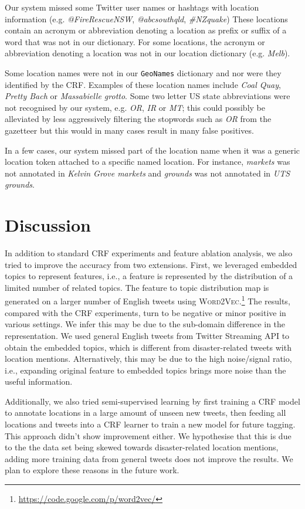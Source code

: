 \documentclass[11pt]{article}
\newcommand{\ie}{i.e.,\xspace}
\newcommand{\geoname}{\texttt{GeoNames}\xspace}
\newcommand{\myex}[1]{\textit{#1}}
\newcommand{\wordvec}{\textsc{Word2Vec}\xspace}
\newcommand{\myurl}[1]{{\footnotesize\url{#1}}}
\begin{document}
Our system missed some Twitter user names or hashtags with location information (e.g. \myex{@FireRescueNSW}, \myex{@abcsouthqld}, \myex{\#NZquake})
These locations contain an acronym or abbreviation denoting a location as prefix or suffix of a word that was not in our dictionary.
For some locations, the acronym or abbreviation denoting a location was not in our location dictionary (e.g. \myex{Melb}).

Some location names were not in our \geoname dictionary and nor were they identified by the CRF.
Examples of these location names include \myex{Coal Quay}, \myex{Pretty Bach} or \myex{Massabielle grotto}.
Some two letter US state abbreviations were not recognised by our system, e.g. \myex{OR}, \myex{IR} or \myex{MT}; this could possibly be alleviated by less aggressively filtering the stopwords such as \myex{OR} from the gazetteer but this would in many cases result in many false positives.

In a few cases, our system missed part of the location name when it was a generic location token attached to a specific named location.
For instance, \myex{markets} was not annotated in \myex{Kelvin Grove markets} and \myex{grounds} was not annotated in \myex{UTS grounds}.

\section{Discussion}
\label{sec:discussion}

In addition to standard CRF experiments and feature ablation analysis, we also tried to improve the accuracy from two extensions.
First, we leveraged embedded topics to represent features, \ie a feature is represented by the distribution of a limited number of related topics.
The feature to topic distribution map is generated on a larger number of English tweets using \wordvec.\footnote{\myurl{https://code.google.com/p/word2vec/}}
The results, compared with the CRF experiments, turn to be negative or minor positive in various settings.
We infer this may be due to the sub-domain difference in the representation.
We used general English tweets from Twitter Streaming API to obtain the embedded topics, which is different from disaster-related tweets with location mentions.
Alternatively, this may be due to the high noise/signal ratio, \ie expanding original feature to embedded topics brings more noise than the useful information.

Additionally, we also tried semi-supervised learning by first training a CRF model to annotate locations in a large amount of unseen new tweets, then feeding all locations and tweets into a CRF learner to train a new model for future tagging.
This approach didn't show improvement either.
We hypothesise that this is due to the the data set being skewed towards disaster-related location mentions, adding more training data from general tweets does not improve the results.
We plan to explore these reasons in the future work.
\end{document}
